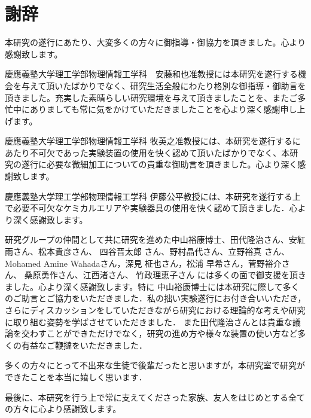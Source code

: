 
\pagestyle{empty}
\chapter*{謝辞}

\par
本研究の遂行にあたり、大変多くの方々に御指導・御協力を頂きました。心より感謝致します。

慶應義塾大学理工学部物理情報工学科　安藤和也准教授には本研究を遂行する機会を与えて頂いたばかりでなく、研究生活全般にわたり格別な御指導・御助言を頂きました。充実した素晴らしい研究環境を与えて頂きましたことを、またご多忙中にありましても常に気をかけていただきましたことを心より深く感謝申し上げます。



慶應義塾大学理工学部物理情報工学科 牧英之准教授には、本研究を遂行するにあたり不可欠であった実験装置の使用を快く認めて頂いたばかりでなく、本研究の遂行に必要な微細加工についての貴重な御助言を頂きました。心より深く感謝致します。

慶應義塾大学理工学部物理情報工学科 伊藤公平教授には、本研究を遂行する上で必要不可欠なケミカルエリアや実験器具の使用を快く認めて頂きました．心より深く感謝致します。

研究グループの仲間として共に研究を進めた中山裕康博士、田代隆治さん、安紅雨さん、松本貴彦さん、
四谷晋太郎
さん、野村晶代さん、立野裕真
さん、Mohamed Amine Wahadaさん，深見 柾也さん，松浦 早希さん，菅野裕介さん、
桑原勇作さん、江西渚さん、
竹政理恵子さん
には多くの面で御支援を頂きました。心より深く感謝致します。特に
中山裕康博士には本研究に際して多くのご助言とご協力をいただきました．私の拙い実験遂行にお付き合いいただき，さらにディスカッションをしていただきながら研究における理論的な考えや研究に取り組む姿勢を学ばさせていただきました．
また田代隆治さんとは貴重な議論を交わすことができただけでなく，研究の進め方や様々な装置の使い方など多くの有益なご鞭撻をいただきました．

多くの方々にとって不出来な生徒で後輩だったと思いますが，本研究室で研究ができたことを本当に嬉しく思います．
\\
\par
最後に、本研究を行う上で常に支えてくださった家族、友人をはじめとする全ての方々に心より感謝致します。